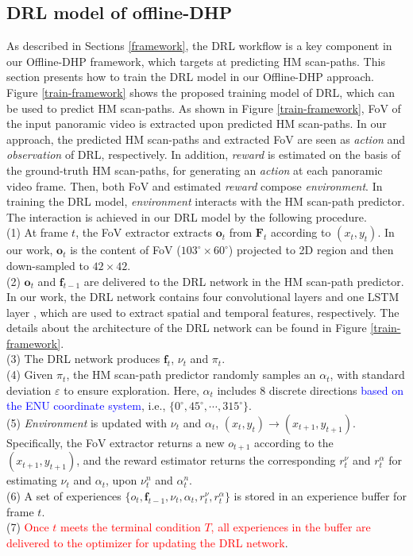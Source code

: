 \documentclass[10pt,journal,compsoc]{IEEEtran}
\begin{document}
\subsection{DRL model of offline-DHP}
\label{train}
As described in Sections \ref{framework}, the DRL workflow is a key component in our Offline-DHP framework, which targets at predicting HM scan-paths.
This section presents how to train the DRL model in our Offline-DHP approach.
Figure \ref{train-framework} shows the proposed training model of DRL, which can be used to predict HM scan-paths.
As shown in Figure \ref{train-framework},  FoV of the input panoramic video is extracted upon predicted HM scan-paths.
In our approach, the predicted HM scan-paths and extracted FoV are seen as \textit{action} and \textit{observation} of DRL, respectively.
In addition, \textit{reward} is estimated on the basis of the ground-truth HM scan-paths, for generating an \textit{action} at each panoramic video frame.
Then, both FoV and estimated \textit{reward} compose \textit{environment}.
In training the DRL model,  \textit{environment} interacts with the HM scan-path predictor.
The interaction is achieved in our DRL model by the following procedure.\\
(1) At frame $t$, the FoV extractor extracts $\mathbf{o}_t$ from $\mathbf{F}_t$ according to $(x_t,y_t)$.
In our work, $\mathbf{o}_{t}$ is the content of FoV ($103^{\circ} \times 60^{\circ}$) projected to 2D region and then down-sampled to $42\times42$.\\
(2) $\mathbf{o}_t$ and $\mathbf{f}_{t-1}$ are delivered to the DRL network in the HM scan-path predictor.
In our work, the DRL network contains four convolutional layers \cite{simonyan2014very} and one LSTM layer \cite{hochreiter1997long, hausknecht2015deep}, which are used to extract spatial and temporal features, respectively. The details about the architecture of the DRL network can be found in Figure \ref{train-framework}.\\
(3) The DRL network produces $\mathbf{f}_{t}$, $\nu_{t}$ and $\pi_{t}$.\\
(4) Given $\pi_{t}$, the HM scan-path predictor randomly samples an $\alpha_t$, with standard deviation $\varepsilon$ to ensure exploration. Here, $\alpha_t$ includes 8 discrete directions \textcolor{blue}{based on the ENU coordinate system}\cite{ENU}, i.e., $\{ 0^{\circ}, 45^{\circ}, \cdots, 315^{\circ} \}$.\\
(5) \textit{Environment} is updated with $\nu_t$ and $\alpha_t$, $(x_t, y_t)\longrightarrow (x_{t+1},y_{t+1})$. Specifically, the FoV extractor returns a new $o_{t+1}$ according to the $(x_{t+1},y_{t+1})$, and the reward estimator returns the corresponding $r^{\nu}_t$ and $r^{\alpha}_t$ for estimating $\nu_t$ and $\alpha_t$, upon $\nu^n_t$ and $\alpha^n_t$.\\
(6) A set of experiences $\{ o_{t}, \! \mathbf{f}_{t-1},\! \nu_t,\! \alpha_t,\! r^{\nu}_{t},\! r^{\alpha}_{t} \}$ is stored in an experience buffer for frame $t$.\\
(7) \textcolor{red}{Once $t$ meets the terminal condition $T$, all experiences in the buffer are delivered to the optimizer for updating the DRL network}.
\end{document}
